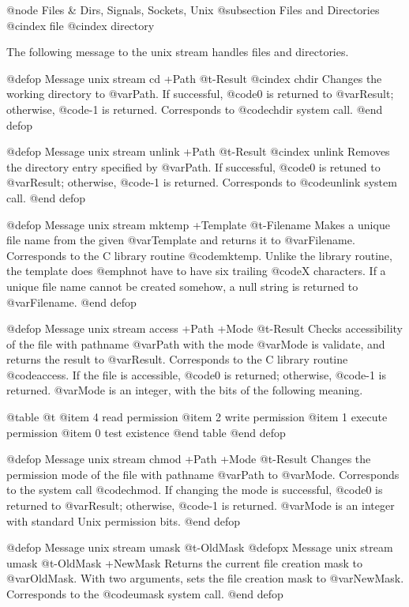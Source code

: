{{{{@node Files & Dirs, Signals, Sockets, Unix
@subsection Files and Directories
@cindex file
@cindex directory

The following message to the unix stream handles files and directories.

@defop {Message} {unix stream} cd +Path @t{-}Result
@cindex chdir
Changes the working directory to @var{Path}.  If successful, @code{0} is
returned to @var{Result}; otherwise, @code{-1} is returned.  Corresponds
to @code{chdir} system call.
@end defop

@defop {Message} {unix stream} unlink +Path @t{-}Result
@cindex unlink
Removes the directory entry specified by @var{Path}.  If successful,
@code{0} is retuned to @var{Result}; otherwise, @code{-1} is returned.
Corresponds to @code{unlink} system call.
@end defop

@defop {Message} {unix stream} mktemp +Template @t{-}Filename
Makes a unique file name from the given @var{Template} and returns it to
@var{Filename}.  Corresponds to the C library routine @code{mktemp}.
Unlike the library routine, the template does @emph{not} have to have
six trailing @code{X} characters.  If a unique file name cannot be
created somehow, a null string is returned to @var{Filename}.
@end defop

@defop {Message} {unix stream} access +Path +Mode @t{-}Result
Checks accessibility of the file with pathname @var{Path} with the mode
@var{Mode} is validate, and returns the result to @var{Result}.
Corresponds to the C library routine @code{access}.  If the file is
accessible, @code{0} is returned; otherwise, @code{-1} is returned.
@var{Mode} is an integer, with the bits of the following meaning.

@table @t
@item 4
read permission
@item 2
write permission
@item 1
execute permission
@item 0
test existence
@end table
@end defop

@defop {Message} {unix stream} chmod +Path +Mode @t{-}Result
Changes the permission mode of the file with pathname @var{Path} to
@var{Mode}.  Corresponds to the system call @code{chmod}.  If changing
the mode is successful, @code{0} is returned to @var{Result}; otherwise,
@code{-1} is returned.  @var{Mode} is an integer with standard Unix
permission bits.
@end defop

@defop {Message} {unix stream} umask @t{-}OldMask
@defopx {Message} {unix stream} umask @t{-}OldMask +NewMask
Returns the current file creation mask to @var{OldMask}.  With two
arguments, sets the file creation mask to @var{NewMask}.  Corresponds to
the @code{umask} system call.
@end defop

}}}}
